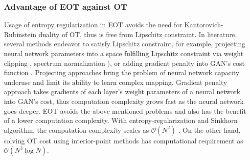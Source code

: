 \subsubsection{Advantage of EOT against OT}

Usage of entropy regularization in EOT avoids the need for Kantorovich-Rubinstein duality
of OT, thus is free from Lipschitz constraint. In literature, several methods endeavor to
satisfy Lipschitz constraint, for example, projecting neural network
parameters into a space fulfilling Lipschitz constraint via weight
clipping \cite{2017arXiv170107875A}, spectrum
normalization \cite{2018arXiv180205957M}), or adding gradient 
penalty into GAN's cost function \cite{2017arXiv170400028G}. Projecting
approaches bring the problem of neural network capacity underuse and
limit its ability to learn complex mapping. Gradient penalty approach takes
gradients of each layer's weight parameters of a neural network into
GAN's cost, thus computation complexity grows fast as the neural
network goes deeper. 
EOT avoids the above mentioned problems and also has the benefit of a lower
computation complexity. With entropy-regularization and Sinkhorn
algorithm, the computation complexity scales as $\mathcal{O}(N^2)$ \cite{2013arXiv1306.0895C}. 
On the other hand, solving OT cost using interior-point methods has computational requirement as 
$\mathcal{O}(N^3\log{N})$. 



